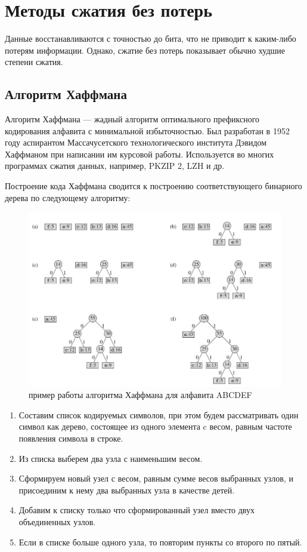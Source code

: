 \section{Методы сжатия без потерь}

Данные восстанавливаются с точностью до бита, что не приводит к каким-либо потерям информации. Однако, сжатие без потерь показывает обычно худшие степени сжатия.


\subsection{Алгоритм Хаффмана}

Алгоритм Хаффмана — жадный алгоритм оптимального префиксного кодирования алфавита с минимальной избыточностью. Был разработан в 1952 году аспирантом Массачусетского технологического института Дэвидом Хаффманом при написании им курсовой работы. Используется во многих программах сжатия данных, например, PKZIP 2, LZH и др.

Построение кода Хаффмана сводится к построению соответствующего бинарного дерева по следующему алгоритму:

\begin{figure}[H]
    \centering
    \includegraphics[width=.9\textwidth]{img/haffman.jpg}    
    \caption{пример работы алгоритма Хаффмана для алфавита ABCDEF}
\end{figure}


\begin{enumerate}
\item Составим список кодируемых символов, при этом будем рассматривать один символ как дерево, состоящее из одного элемента c весом, равным частоте появления символа в строке.
\item Из списка выберем два узла с наименьшим весом.
\item Сформируем новый узел с весом, равным сумме весов выбранных узлов, и присоединим к нему два выбранных узла в качестве детей.
\item Добавим к списку только что сформированный узел вместо двух объединенных узлов.
\item Если в списке больше одного узла, то повторим пункты со второго по пятый.
\end{enumerate}


